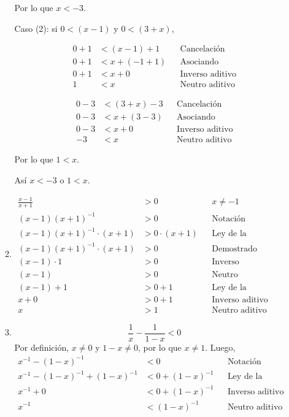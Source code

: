 \documentclass[11pt]{article}
\begin{document}
\begin{enumerate}
\begin{enumerate}[label=(\alph*)]
 Por lo que $x<-3$.

 Caso (2): si $0<(x-1)$ y $0<(3+x)$,

 \noindent\begin{minipage}[c]{.5\linewidth}
  \begin{align*}
   0 +1&< (x-1)+1&& \text{Cancelación}\\
   0 +1&< x+(-1+1)&& \text{Asociando}\\
   0 +1&< x+0&& \text{Inverso aditivo}\\
   1&< x&& \text{Neutro aditivo}
  \end{align*} \end{minipage}%
  \begin{minipage}[c]{.5\linewidth}
   \begin{align*}
    0 - 3 &< (3+x) - 3 && \text{Cancelación}\\
    0 - 3 &< x + (3-3) && \text{Asociando}\\
    0 - 3 &< x + 0 && \text{Inverso aditivo}\\
    -3 &< x && \text{Neutro aditivo}
   \end{align*}
  \end{minipage}

  Por lo que $1<x$.

  Así $x<-3$ o $1<x$.

  \item \begin{align*}
   \frac{x-1}{x+1} &> 0 && \text{$x\neq -1$}\\
   (x-1)(x+1)^{-1} &> 0&& \text{Notación}\\
   (x-1)(x+1)^{-1} \cdot (x+1)&> 0\cdot (x+1)&& \text{Ley de la cancelación}\\
   (x-1)(x+1)^{-1} \cdot (x+1)&> 0&& \text{Demostrado anteriormente}\\
   (x-1) \cdot 1 &> 0&& \text{Inverso multiplicativo}\\
   (x-1) &> 0&& \text{Neutro multiplicativo}\\
   (x-1) +1&> 0+1&& \text{Ley de la cancelación}\\
   x + 0 &> 0 + 1 && \text{Inverso aditivo}\\
   x &>1 && \text{Neutro aditivo}
 \end{align*}

  \item \[\frac{1}{x}-\frac{1}{1-x}<0\] Por definición, $x\neq 0$ y $1-x\neq 0$, por lo que $x\neq 1$. Luego, \begin{align*}
  x^{-1}-(1-x)^{-1} &< 0 && \text{Notación}\\
  x^{-1}-(1-x)^{-1} +(1-x)^{-1}&< 0 +(1-x)^{-1} && \text{Ley de la cancelación}\\
  x^{-1}+0&< 0 +(1-x)^{-1} && \text{Inverso aditivo}\\
  x^{-1}&<(1-x)^{-1} && \text{Neutro aditivo}
  \end{align*}


\end{enumerate}
\end{enumerate}
\end{document}

